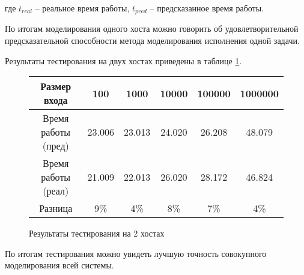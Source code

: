 \documentclass[../diploma.tex]{subfile}
\begin{document}
    где $ t_{real} $ -- реальное время работы, $ t_{pred} $ -- предсказанное
    время работы.

    По итогам моделирования одного хоста можно говорить об удовлетворительной
    предсказательной способности метода моделирования исполнения одной задачи.


    Результаты тестирования на двух хостах приведены в таблице
    \ref{table:testing_double}.

    \begin{figure}[H]
    \centering
    \begin{tabular}{c|c|c|c|c|c}
        Размер входа          & 100    & 1000   & 10000  & 100000  & 1000000 \\ \hline
        Время работы (пред)   & 23.006 & 23.013 & 24.020 & 26.208  & 48.079   \\
        Время работы (реал)   & 21.009 & 22.013 & 26.020 & 28.172  & 46.824   \\
        Разница               & 9\%    & 4\%    & 8\%    & 7\%     & 4\%
    \end{tabular}
    \caption{Результаты тестирования на 2 хостах}
    \label{table:testing_double}
    \end{figure}

    По итогам тестирования можно увидеть лучшую точность совокупного
    моделирования всей системы. 
\end{document}

